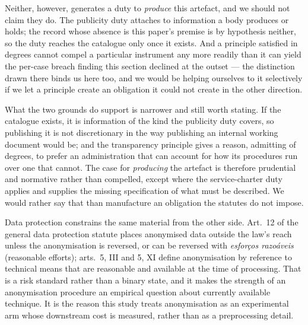 Neither, however, generates a duty to \emph{produce} this artefact, and we should not claim they
do. The publicity duty attaches to information a body produces or holds; the record whose
absence is this paper's premise is by hypothesis neither, so the duty reaches the catalogue only
once it exists. And a principle satisfied in degrees cannot compel a particular instrument any
more readily than it can yield the per-case breach finding this section declined at the outset
--- the distinction drawn there binds us here too, and we would be helping ourselves to it
selectively if we let a principle create an obligation it could not create in the other
direction.

What the two grounds do support is narrower and still worth stating. If the catalogue exists, it
is information of the kind the publicity duty covers, so publishing it is not discretionary in
the way publishing an internal working document would be; and the transparency principle gives a
reason, admitting of degrees, to prefer an administration that can account for how its
procedures run over one that cannot. The case for \emph{producing} the artefact is therefore
prudential and normative rather than compelled, except where the service-charter duty applies
and supplies the missing specification of what must be described. We would rather say that than
manufacture an obligation the statutes do not impose.

Data protection constrains the same material from the other side. Art.~12 of the general
data protection statute \citep{brasil2018lgpd} places anonymised data outside the law's
reach unless the anonymisation is reversed, or can be reversed with \emph{esfor\c{c}os
razo\'aveis} (reasonable efforts); arts.~5, III and 5, XI define anonymisation by reference
to technical means that are reasonable and available at the time of processing. That is a
risk standard rather than a binary state, and it makes the strength of an anonymisation
procedure an empirical question about currently available technique. It is the reason this
study treats anonymisation as an experimental arm whose downstream cost is measured, rather
than as a preprocessing detail.

